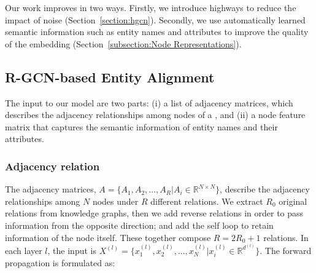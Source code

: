  Our work improves \RGCNs in two ways. Firstly, we introduce highways to reduce the impact of noise (Section~\ref{section:hgcn}).
    Secondly, we use automatically learned semantic information such as entity names and attributes to improve the quality of the \KG
    embedding (Section~\ref{subsection:Node Representations}).




	
	
	\subsection{R-GCN-based Entity Alignment}
	\label{section:rgcn}	

 	The input to our \RGCN model are two parts: (i) a list of adjacency matrices, which describes the adjacency relationships among nodes of a
 \KG, and (ii) a node feature matrix that captures the semantic information of entity names and their attributes.

%


 \subsubsection{Adjacency relation}
 The adjacency matrices, $A=\{A_1,A_2,...,A_R |A_i \in \mathbb{R}^{N
 \times N} \}$, describe the adjacency relationships among $N$ nodes under $R$ different relations.
 We extract $R_0$ original
 relations from knowledge graphs, then we add reverse relations in order to pass information from the opposite direction; and add the self
 loop to retain information of the node itself. These together compose $R=2R_0+1$ relations. 	In each layer $l$, the input is $X^{(l)} =
 \{x^{(l)}_1,x^{(l)}_2,...,x^{(l)}_{N} |x^{(l)}_{i} \in \mathbb{R}^{d^{(l)}}\}$. The forward propagation is formulated as:


